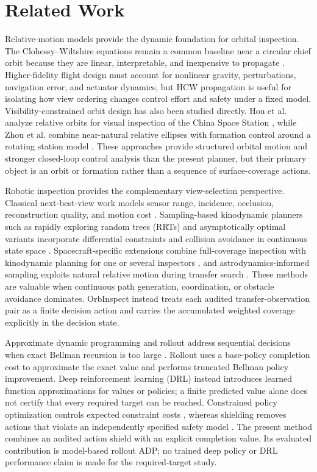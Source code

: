 \documentclass{IEEEtaes}
\theoremstyle{remark}
\theoremstyle{plain}
\begin{document}
\section{Related Work}
\label{sec:related}

Relative-motion models provide the dynamic foundation for orbital inspection. The Clohessy--Wiltshire equations remain a common baseline near a circular chief orbit because they are linear, interpretable, and inexpensive to propagate \cite{clohessy1960terminal,wertz2011space}. Higher-fidelity flight design must account for nonlinear gravity, perturbations, navigation error, and actuator dynamics, but HCW propagation is useful for isolating how view ordering changes control effort and safety under a fixed model. Visibility-constrained orbit design has also been studied directly. Hou et al. analyze relative orbits for visual inspection of the China Space Station \cite{hou2024relative}, while Zhou et al. combine near-natural relative ellipses with formation control around a rotating station model \cite{zhou2026formation}. These approaches provide structured orbital motion and stronger closed-loop control analysis than the present planner, but their primary object is an orbit or formation rather than a sequence of surface-coverage actions.

Robotic inspection provides the complementary view-selection perspective. Classical next-best-view work models sensor range, incidence, occlusion, reconstruction quality, and motion cost \cite{scott2003view}. Sampling-based kinodynamic planners such as rapidly exploring random trees (RRTs) and asymptotically optimal variants incorporate differential constraints and collision avoidance in continuous state space \cite{lavalle1998rapidly,karaman2011sampling}. Spacecraft-specific extensions combine full-coverage inspection with kinodynamic planning for one or several inspectors \cite{faghihi2022kinodynamic,faghihi2023multiple}, and astrodynamics-informed sampling exploits natural relative motion during transfer search \cite{deka2023astrodynamics}. These methods are valuable when continuous path generation, coordination, or obstacle avoidance dominates. OrbInspect instead treats each audited transfer-observation pair as a finite decision action and carries the accumulated weighted coverage explicitly in the decision state.

Approximate dynamic programming and rollout address sequential decisions when exact Bellman recursion is too large \cite{bertsekas2020rollout,bertsekas1996neuro}. Rollout uses a base-policy completion cost to approximate the exact value and performs truncated Bellman policy improvement. Deep reinforcement learning (DRL) instead introduces learned function approximations for values or policies; a finite predicted value alone does not certify that every required target can be reached. Constrained policy optimization controls expected constraint costs \cite{achiam2017cpo}, whereas shielding removes actions that violate an independently specified safety model \cite{alshiekh2018shielding}. The present method combines an audited action shield with an explicit completion value. Its evaluated contribution is model-based rollout ADP; no trained deep policy or DRL performance claim is made for the required-target study.
\end{document}
